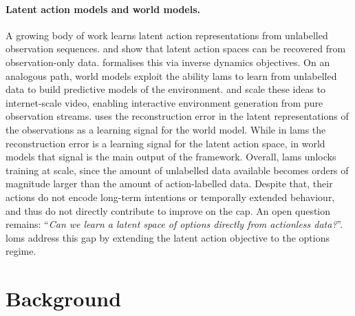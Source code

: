 \documentclass{article}
\theoremstyle{postulate}
\begin{document}
\paragraph{Latent action models and world models.}
A growing body of work learns latent action representations from unlabelled observation sequences.
\citet{rybkin2019clasp} and \citet{edwards2019ilpo} show that latent action spaces can be recovered from observation-only data.
\citet{schmidt2024lapo} formalises this via inverse dynamics objectives.
%
On an analogous path, world models exploit the ability \glspl{lam} to learn from unlabelled data to build predictive models of the environment.
\citet{bruce2024genie} and \citet{ye2023ficc} scale these ideas to internet-scale video, enabling interactive environment generation from pure observation streams.
\citet{assran2025v} uses the reconstruction error in the latent representations of the observations as a learning signal for the world model.
While in \glspl{lam} the reconstruction error is a learning signal for the latent action space, in world models that signal is the main output of the framework.
%
Overall, \glspl{lam} unlocks training at scale, since the amount of unlabelled data available becomes orders of magnitude larger than the amount of action-labelled data.
Despite that, their actions do not encode long-term intentions or temporally extended behaviour, and thus do not directly contribute to improve on the \gls{cap}.
An open question remains: ``\textit{Can we learn a latent space of options directly from actionless data?}''.
\glspl{lom} address this gap by extending the latent action objective to the options regime.





\section{Background}
\label{sec:background}
\end{document}
